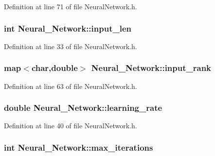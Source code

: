 Definition at line 71 of file Neural\-Network.\-h.

\hypertarget{a00003_a9e5319bf385fa55bbbd8f0160915306d}{
\subsubsection[{input\-\_\-len}]{\setlength{\rightskip}{0pt plus 5cm}int Neural\-\_\-\-Network\-::input\-\_\-len\hspace{0.3cm}{\ttfamily [private]}}}\label{d1/d7c/a00003_a9e5319bf385fa55bbbd8f0160915306d}


Definition at line 33 of file Neural\-Network.\-h.

\hypertarget{a00003_adf2c6662b130ed1582025ea2cccacbe2}{
\subsubsection[{input\-\_\-rank}]{\setlength{\rightskip}{0pt plus 5cm}map$<$char,double$>$ Neural\-\_\-\-Network\-::input\-\_\-rank\hspace{0.3cm}{\ttfamily [private]}}}\label{d1/d7c/a00003_adf2c6662b130ed1582025ea2cccacbe2}


Definition at line 63 of file Neural\-Network.\-h.

\hypertarget{a00003_a1994986029a1ef9d55fa4bb1b440210b}{
\subsubsection[{learning\-\_\-rate}]{\setlength{\rightskip}{0pt plus 5cm}double Neural\-\_\-\-Network\-::learning\-\_\-rate\hspace{0.3cm}{\ttfamily [private]}}}\label{d1/d7c/a00003_a1994986029a1ef9d55fa4bb1b440210b}


Definition at line 40 of file Neural\-Network.\-h.

\hypertarget{a00003_ac3c1eed9835dc5da84132d08c090612f}{
\subsubsection[{max\-\_\-iterations}]{\setlength{\rightskip}{0pt plus 5cm}int Neural\-\_\-\-Network\-::max\-\_\-iterations\hspace{0.3cm}{\ttfamily [private]}}}\label{d1/d7c/a00003_ac3c1eed9835dc5da84132d08c090612f}


